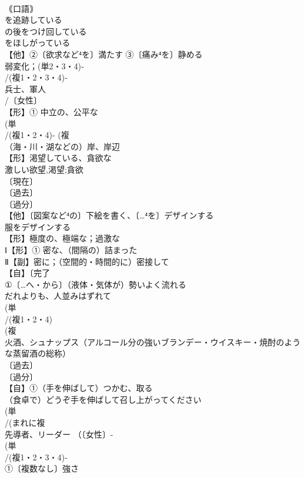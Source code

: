 \documentclass[8pt]{extreport}
\begin{document}
\begin{CJK}{UTF8}{min}
\\	｟口語｠ 
\\	を追跡している 
\\	の後をつけ回している 
\\	をほしがっている
\\	【他】②〔欲求など⁴を〕満たす ③〔痛み⁴を〕静める
\\	弱変化；(単2・3・4)‐
\\	/(複1・2・3・4)‐
\\	兵士、軍人 
\\	/〔女性〕
\\	【形】① 中立の、公平な
\\	(単
\\	/(複1・2・4)- (複
\\	（海・川・湖などの）岸、岸辺 
\\	【形】渇望している、貪欲な 
\\	激しい欲望,渇望;貪欲
\\	〔現在〕
\\	〔過去〕
\\	〔過分〕
\\	【他】〔図案など⁴の〕下絵を書く、〔…⁴を〕デザインする 
\\	服をデザインする
\\	【形】極度の、極端な；過激な 
\\	Ⅰ【形】① 密な、（間隔の）詰まった 
\\	Ⅱ【副】密に；（空間的・時間的に）密接して 
\\	【自】〔完了
\\	①〔…へ・から〕（液体・気体が）勢いよく流れる 
\\	だれよりも、人並みはずれて
\\	(単
\\	/(複1・2・4)
\\	(複
\\	火酒、シュナップス（アルコール分の強いブランデー・ウイスキー・焼酎のような蒸留酒の総称）
\\	〔過去〕
\\	〔過分〕
\\	【自】①（手を伸ばして）つかむ、取る 
\\	（食卓で）どうぞ手を伸ばして召し上がってください
\\	(単
\\	/(まれに複
\\	先導者、リーダー （〔女性〕-
\\	(単
\\	/(複1・2・3・4)‐
\\	①〔複数なし〕強さ 

\end{CJK}
\end{document}
